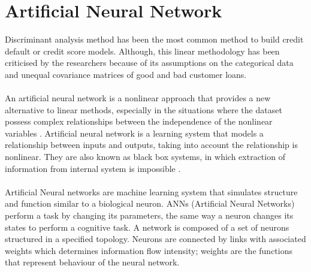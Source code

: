 \documentclass{article}[]
\begin{document}
\section{Artificial Neural Network}
Discriminant analysis method has been the most common method to build credit default or credit score models. Although, this linear methodology has been criticised by the researchers because of its assumptions on the categorical data and unequal covariance matrices of good and bad customer loans.\\\\
An artificial neural network \cite{hornik1989multilayer}\cite{bebis1994feed} is a nonlinear approach that provides a new alternative to linear methods, especially in the situations where the dataset possess complex relationships between the independence of the nonlinear variables \cite{atiya2001bankruptcy} \cite{pang2002credit}. Artificial neural network is a learning system that models a relationship between inputs and outputs, taking into account the relationship is nonlinear. They are also known as black box systems, in which extraction of information from internal system is impossible \cite{angelini2008neural}.\\\\
Artificial Neural networks are machine learning system that simulates structure and function similar to a biological neuron. ANNs (Artificial Neural Networks) perform a task by changing its parameters, the same way a neuron changes its states to perform a cognitive task. A network is composed of a set of neurons structured in a specified topology. Neurons are connected by links with associated weights which determines information flow intensity; weights are the functions that represent behaviour of the neural network.\\\\
\end{document}
